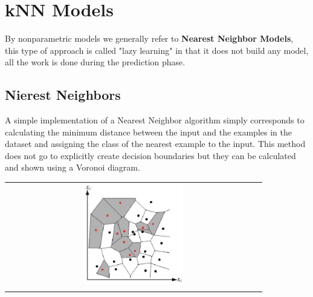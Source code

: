 \section{kNN Models}
By nonparametric models we generally refer to \textbf{Nearest Neighbor Models}, this type of approach is called "lazy learning" in that it does not build any model, all the work is done during the prediction phase.

\subsection{Nierest Neighbors}
A simple implementation of a Nearest Neighbor algorithm simply corresponds to calculating the minimum distance between the input and the examples in the dataset and assigning the class of the nearest example to the input.
This method does not go to explicitly create decision boundaries but they can be calculated and shown using a Voronoi diagram.
\begin{center}
    \begin{tabular}{c}
        \\ \includegraphics[width=0.4\textwidth]{images/kNN1.png} \\ \\
    \end{tabular}
\end{center}

